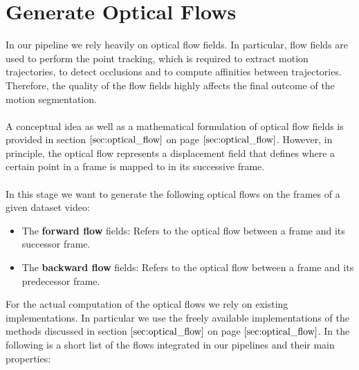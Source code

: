 \section{Generate Optical Flows}
\label{sec:generate_of}
In our pipeline we rely heavily on optical flow fields. In particular, flow fields are used to perform the point tracking, which is required to extract motion trajectories, to detect occlusions and to compute affinities between trajectories. Therefore, the quality of the flow fields highly affects the final outcome of the motion segmentation. \\ \\
A conceptual idea as well as a mathematical formulation of optical flow fields is provided in section $\ref{sec:optical_flow}$ on page $\pageref{sec:optical_flow}$. However, in principle, the optical flow represents a displacement field that defines where a certain point in a frame is mapped to in its successive frame. \\ \\
In this stage we want to generate the following optical flows on the frames of a given dataset video:
\begin{itemize}
	\item The \textbf{forward flow} fields: Refers to the optical flow between a frame and its successor frame.
	\item The \textbf{backward flow} fields: Refers to the optical flow between a frame and its predecessor frame.
\end{itemize}
For the actual computation of the optical flows we rely on existing implementations. In particular we use the freely available implementations of the methods discussed in section $\ref{sec:optical_flow}$ on page $\pageref{sec:optical_flow}$. In the following is a short list of the flows integrated in our pipelines and their main properties:
